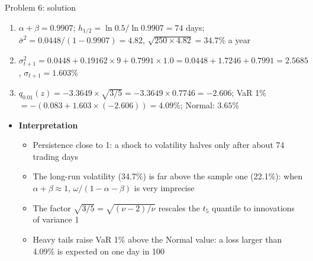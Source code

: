 \begin{frame}{Problem 6: solution}
\itemsize{\footnotesize}
\begin{enumerate}
    \item $\alpha + \beta = 0.9907$; $h_{1/2} = \ln 0.5/\ln 0.9907 = 74$ days; $\bar\sigma^2 = 0.0448/(1 - 0.9907) = 4.82$, $\sqrt{250 \times 4.82} = 34.7\%$ a year
    \item $\sigma_{t+1}^2 = 0.0448 + 0.19162 \times 9 + 0.7991 \times 1.0 = 0.0448 + 1.7246 + 0.7991 = 2.5685$, $\sigma_{t+1} = 1.603\%$
    \item $q_{0.01}(z) = \ensuremath{-}3.3649 \times \sqrt{3/5} = \ensuremath{-}3.3649 \times 0.7746 = \ensuremath{-}2.606$; VaR 1\% $= -(0.083 + 1.603 \times (\ensuremath{-}2.606)) = 4.09\%$; Normal: $3.65\%$
\end{enumerate}
\begin{itemize}
    \item \textbf{Interpretation}
    \begin{itemize}
        \item Persistence close to 1: a shock to volatility halves only after about 74 trading days
        \item The long-run volatility (34.7\%) is far above the sample one (22.1\%): when $\alpha + \beta \approx 1$, $\omega/(1 - \alpha - \beta)$ is very imprecise
        \item The factor $\sqrt{3/5} = \sqrt{(\nu - 2)/\nu}$ rescales the $t_5$ quantile to innovations of variance 1
        \item Heavy tails raise VaR 1\% above the Normal value: a loss larger than 4.09\% is expected on one day in 100
    \end{itemize}
\end{itemize}
\end{frame}

